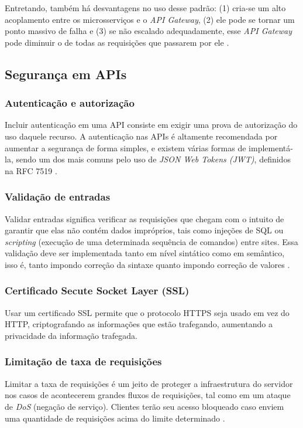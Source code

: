 Entretando, também há desvantagens no uso desse padrão: (1) cria-se um alto acoplamento entre os microsserviços e o \emph{API Gateway}, (2) ele pode se tornar um ponto massivo de falha e (3) se não escalado adequadamente, esse \emph{API Gateway} pode diminuir o de todas as requisições que passarem por ele \cite{microsoft-api-gateway}.

\subsection{Segurança em APIs}

\subsubsection*{Autenticação e autorização}

Incluir autenticação em uma API consiste em exigir uma prova de autorização do uso daquele recurso. A autenticação nas APIs é altamente recomendada por aumentar a segurança de forma simples, e existem várias formas de implementá-la, sendo um dos mais comuns pelo uso de \emph{JSON Web Tokens (JWT)}, definidos na RFC 7519 \cite{rfc_http_nielsen_1999}.

\subsubsection*{Validação de entradas}

Validar entradas significa verificar as requisições que chegam com o intuito de garantir que elas não contém dados impróprios, tais como injeções de SQL ou \emph{scripting} (execução de uma determinada sequência de comandos) entre sites. Essa validação deve ser implementada tanto em nível sintático como em semântico, isso é, tanto impondo correção da sintaxe quanto impondo correção de valores \cite{api-design-restfulapi}.

\subsubsection*{Certificado Secute Socket Layer (SSL)}
Usar um certificado SSL permite que o protocolo HTTPS seja usado em vez do HTTP, criptografando as informações que estão trafegando, aumentando a privacidade da informação trafegada. \cite{api-design-restfulapi}

\subsubsection*{Limitação de taxa de requisições}
Limitar a taxa de requisições é um jeito de proteger a infraestrutura do servidor nos casos de acontecerem grandes fluxos de requisições, tal como em um ataque de \emph{DoS} (negação de serviço). Clientes terão seu acesso bloqueado caso enviem uma quantidade de requisições acima do limite determinado \cite{api-design-restfulapi}.

